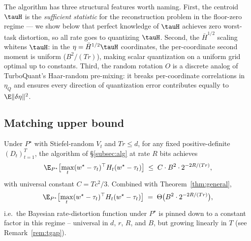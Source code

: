 The algorithm has three structural features worth naming. First,
the centroid $\tauH$ is the \emph{sufficient statistic} for the
reconstruction problem in the floor-zero regime — we show below
that perfect knowledge of $\tauH$ achieves zero worst-task
distortion, so all rate goes to quantizing $\tauH$. Second, the
$\bar H^{1/2}$ scaling whitens $\tauH$: in the $\eta = \bar H^{1/2}
\tauH$ coordinates, the per-coordinate second moment is uniform
($B^2/(Tr)$), making scalar quantization on a uniform grid
optimal up to constants. Third, the random rotation $O$ is a
discrete analog of TurboQuant's Haar-random pre-mixing: it
breaks per-coordinate correlations in $\eta_Q$ and ensures every
direction of quantization error contributes equally to
$\E\|\delta\eta\|^2$.

\subsection{Matching upper bound}\label{subsec:match}

\begin{theorem}
\label{thm:achv}
Under $P^\star$ with Stiefel-random $V_t$ and $Tr\leq d$, for
any fixed positive-definite $(D_t)_{t=1}^T$, the algorithm of
\S\ref{subsec:alg} at rate $R$ bits achieves
\begin{equation}\label{eq:thm-ub}
  \E_{P^\star}\bigl[\max_t(w^\star-\tau_t)^\top H_t(w^\star-
  \tau_t)\bigr]
  \;\leq\; C\cdot B^2 \cdot 2^{-2R/(Tr)},
\end{equation}
with universal constant $C = T c^2 / 3$. Combined with
Theorem~\ref{thm:general},
\begin{equation*}
  \E_{P^\star}\bigl[\max_t(w^\star-\tau_t)^\top H_t(w^\star-
  \tau_t)\bigr] \;=\; \Theta\bigl(B^2\cdot 2^{-2R/(Tr)}\bigr),
\end{equation*}
i.e.\ the Bayesian rate-distortion function under $P^\star$ is
pinned down to a constant factor in this regime -- universal in
$d$, $r$, $R$, and $B$, but growing linearly in $T$ (see
Remark~\ref{rem:tgap}).
\end{theorem}

